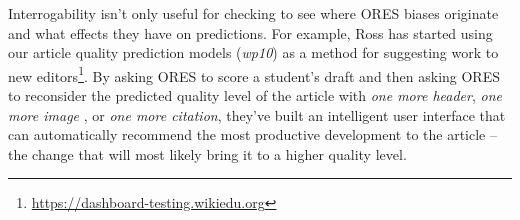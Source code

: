 Interrogability isn't only useful for checking to see where ORES biases originate and what effects they have on predictions.  For example, Ross has started using our article quality prediction models (\emph{wp10}) as a method for suggesting work to new editors\footnote{\url{https://dashboard-testing.wikiedu.org}}.  By asking ORES to score a student's draft and then asking ORES to reconsider the predicted quality level of the article with \emph{one more header}, \emph{one more image} , or \emph{one more citation}, they've built an intelligent user interface that can automatically recommend the most productive development to the article -- the change that will most likely bring it to a higher quality level.
